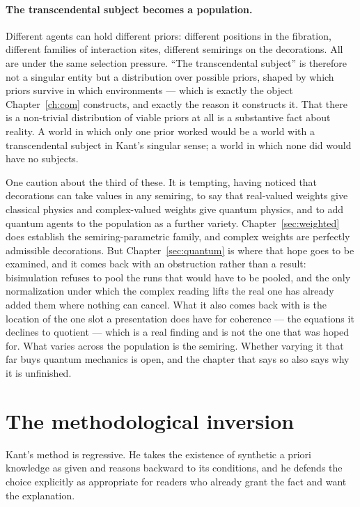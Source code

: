 \paragraph{The transcendental subject becomes a population.}
Different agents can hold different priors: different positions in
the fibration, different families of interaction sites, different
semirings on the decorations.
All are under the same selection pressure.
``The transcendental subject'' is therefore not a singular entity
but a distribution over possible priors, shaped by which priors
survive in which environments --- which is exactly the object
Chapter~\ref{ch:com} constructs, and exactly the reason it
constructs it.
That there is a non-trivial distribution of viable priors at all is
a substantive fact about reality.
A world in which only one prior worked would be a world with a
transcendental subject in Kant's singular sense; a world in which
none did would have no subjects.

One caution about the third of these.
It is tempting, having noticed that decorations can take values in
any semiring, to say that real-valued weights give classical
physics and complex-valued weights give quantum physics, and to add
quantum agents to the population as a further variety.
Chapter~\ref{sec:weighted} does establish the semiring-parametric
family, and complex weights are perfectly admissible decorations.
But Chapter~\ref{sec:quantum} is where that hope goes to be
examined, and it comes back with an obstruction rather than a
result: bisimulation refuses to pool the runs that would have to be
pooled, and the only normalization under which the complex reading
lifts the real one has already added them where nothing can cancel.
What it also comes back with is the location of the one slot a
presentation does have for coherence --- the equations it declines
to quotient --- which is a real finding and is not the one that was
hoped for.
What varies across the population is the semiring.
Whether varying it that far buys quantum mechanics is open, and the
chapter that says so also says why it is unfinished.

\section{The methodological inversion}
\label{sec:kant-method}

Kant's method is regressive.
He takes the existence of synthetic a priori knowledge as given and
reasons backward to its conditions, and he defends the choice
explicitly as appropriate for readers who already grant the fact
and want the explanation.

